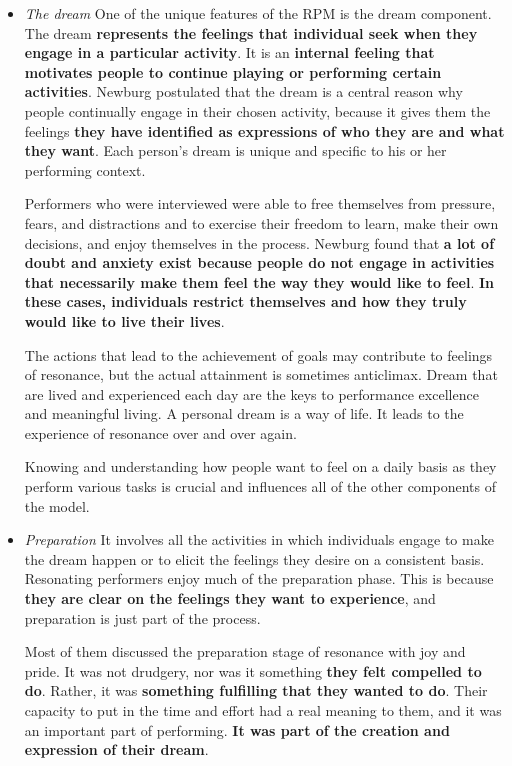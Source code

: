 \documentclass[ebook,12pt,oneside,openany]{memoir}
\begin{document}
\begin{itemize}
    \item \textit{The dream} One of the unique features of the RPM is the dream component. The dream \textbf{represents the feelings that individual seek when they engage in a particular activity}.
    It is an \textbf{internal feeling that motivates people to continue playing or performing certain activities}.
    Newburg postulated that the dream is a central reason why people continually engage in their chosen activity, because it gives them the feelings \textbf{they have identified as expressions of who they are and what they want}.
    Each person's dream is unique and specific to his or her performing context.

    Performers who were interviewed were able to free themselves from pressure, fears, and distractions and to exercise their freedom to learn, make their own decisions, and enjoy themselves in the process.
    Newburg found that \textbf{a lot of doubt and anxiety exist because people do not engage in activities that necessarily make them feel the way they would like to feel}.
    \textbf{In these cases, individuals restrict themselves and how they truly would like to live their lives}. 

    The actions that lead to the achievement of goals may contribute to feelings of resonance, but the actual attainment is sometimes anticlimax.
    Dream that are lived and experienced each day are the keys to performance excellence and meaningful living. A personal dream is a way of life.
    It leads to the experience of resonance over and over again. 

    Knowing and understanding how people want to feel on a daily basis as they perform various tasks is crucial and influences all of the other components of the model.

    \item \textit{Preparation} It involves all the activities in which individuals engage to make the dream happen or to elicit the feelings they desire on a consistent basis.
    Resonating performers enjoy much of the preparation phase. This is because \textbf{they are clear on the feelings they want to experience}, and preparation is just part of the process.

    Most of them discussed the preparation stage of resonance with joy and pride. It was not drudgery, nor was it something \textbf{they felt compelled to do}. Rather, it was \textbf{something fulfilling that they wanted to do}.
    Their capacity to put in the time and effort had a real meaning to them, and it was an important part of performing.
    \textbf{It was part of the creation and expression of their dream}.


\end{itemize}
\end{document}
